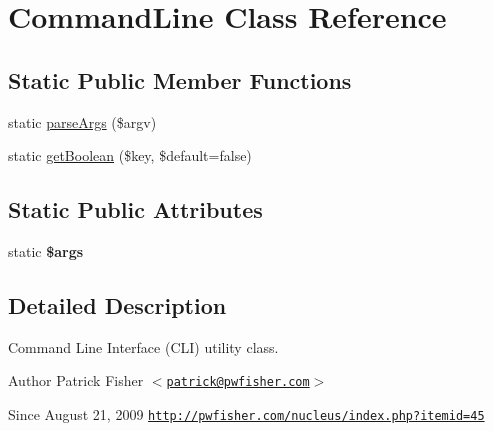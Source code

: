\hypertarget{class_pw_fisher_1_1_command_line_1_1_command_line}{
\section{\-Command\-Line \-Class \-Reference}
\label{class_pw_fisher_1_1_command_line_1_1_command_line}
}
\subsection*{\-Static \-Public \-Member \-Functions}
\begin{DoxyCompactItemize}
\item 
static \hyperlink{class_pw_fisher_1_1_command_line_1_1_command_line_aa367e54f990c7fd9c495576f3e0b8eb3}{parse\-Args} (\$argv)
\item 
static \hyperlink{class_pw_fisher_1_1_command_line_1_1_command_line_a933b44e772937fda17dc7d29ec94dc33}{get\-Boolean} (\$key, \$default=false)
\end{DoxyCompactItemize}
\subsection*{\-Static \-Public \-Attributes}
\begin{DoxyCompactItemize}
\item 
\hypertarget{class_pw_fisher_1_1_command_line_1_1_command_line_a67e94494731d99ed23b123e95175bc10}{
static {\bfseries \$args}}
\label{class_pw_fisher_1_1_command_line_1_1_command_line_a67e94494731d99ed23b123e95175bc10}

\end{DoxyCompactItemize}


\subsection{\-Detailed \-Description}
\-Command \-Line \-Interface (\-C\-L\-I) utility class.

\begin{DoxyAuthor}{\-Author}
\-Patrick \-Fisher $<$\href{mailto:patrick@pwfisher.com}{\tt patrick@pwfisher.\-com}$>$ 
\end{DoxyAuthor}
\begin{DoxySince}{\-Since}
\-August 21, 2009  \href{http://pwfisher.com/nucleus/index.php?itemid=45}{\tt http\-://pwfisher.\-com/nucleus/index.\-php?itemid=45} 
\end{DoxySince}



